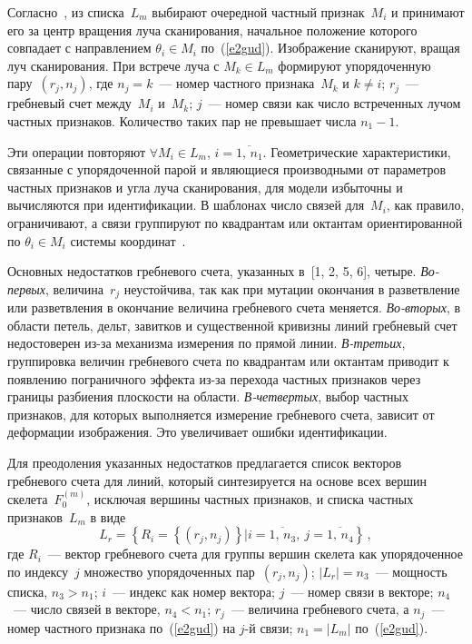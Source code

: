 \begin{multicols}{2}
Согласно~\cite{5gud}, из списка~$L_m$ выбирают очередной частный признак~$M_i$ и
принимают его за центр вращения луча сканирования, начальное положение которого совпадает
с направлением $\theta_i \in M_i$ по~(\ref{e2gud}). Изображение сканируют, вращая луч
сканирования. При встрече луча с $M_k \in L_m$ формируют упорядоченную пару~$(r_j,n_j)$,
где $n_j=k$~--- номер частного признака~$M_k$ и $k\not= i$; $r_j$~--- гребневый счет
между~$M_i$ и~$M_k$; $j$~--- номер связи как число встреченных лучом частных признаков.
Количество таких пар не превышает числа $n_1-1$.

Эти операции повторяют $\forall M_i\in L_m$, $i=\overline{1,\,n_1}$. Геометрические
характеристики, связанные с упорядоченной парой и являющиеся производными от параметров
частных признаков и угла луча сканирования, для модели избыточны и вычисляются при
идентификации. В шаблонах число связей для~$M_i$, как правило, ограничивают, а связи
группируют по квадрантам или октантам ориентированной по $\theta_i \in M_i$ системы
координат~\cite{5gud}.

Основных недостатков гребневого счета, указанных в~[1, 2, 5, 6], четыре.
\textit{Во-первых}, величина~$r_j$ неустойчива, так как при мутации окончания в разветвление
или разветвления в окончание величина гребневого счета меняется. \textit{Во-вторых}, в области
петель, дельт, завитков и существенной кривизны линий гребневый счет недостоверен из-за
механизма измерения по прямой линии. \textit{В-третьих}, группировка величин гребневого
счета по квадрантам или октантам приводит к появлению пограничного эффекта из-за перехода
частных признаков через границы разбиения плоскости на области. \textit{В-четвертых}, выбор
частных признаков, для которых выполняется измерение гребневого счета, зависит от
деформации изображения. Это увеличивает ошибки идентификации.

Для преодоления указанных недостатков предлагается список векторов гребневого счета для
линий, который синтезируется на основе всех вершин скелета~$F_0^{(m)}$, исключая вершины
частных признаков, и списка частных признаков~$L_m$ в виде
\begin{equation}
L_r =\left \{ R_i=\left \{ (r_j,n_j)\right \}\vert i=\overline{1,\,n_3},\ j=\overline{1,\,n_4}\right \}\,,
\label{e4gud}
\end{equation}
где $R_i$~--- вектор гребневого счета для группы вершин скелета как упорядоченное по
индексу~$j$ множество упорядоченных пар~$(r_j,n_j)$; $\vert L_r\vert =n_3$~--- мощность
списка, $n_3>n_1$; $i$~--- индекс как номер вектора; $j$~--- номер связи в векторе; $n_4$~---
число связей в векторе, $n_4<n_1$; $r_j$~--- величина гребневого счета, а $n_j$~--- номер
частного признака по~(\ref{e2gud}) на $j$-й связи; $n_1=\vert L_m\vert$ по~(\ref{e2gud}).


\end{multicols}
